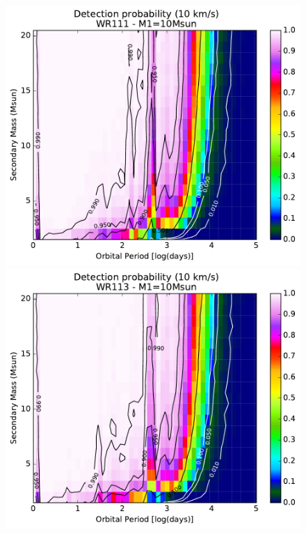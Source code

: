 \begin{figure}[h!]
\begin{minipage}{0.49\textwidth}
    \end{minipage}
    \begin{minipage}{0.49\textwidth}
    \centering
    \includegraphics[width=\textwidth]{chapters/appendix3/image/111PM2_thres10_MAR31.pdf}
    \end{minipage}
    \begin{minipage}{0.49\textwidth}
    \centering
    \includegraphics[width=\textwidth]{chapters/appendix3/image/113PM2_thres10_MAR31.pdf}

\end{minipage}
\end{figure}
